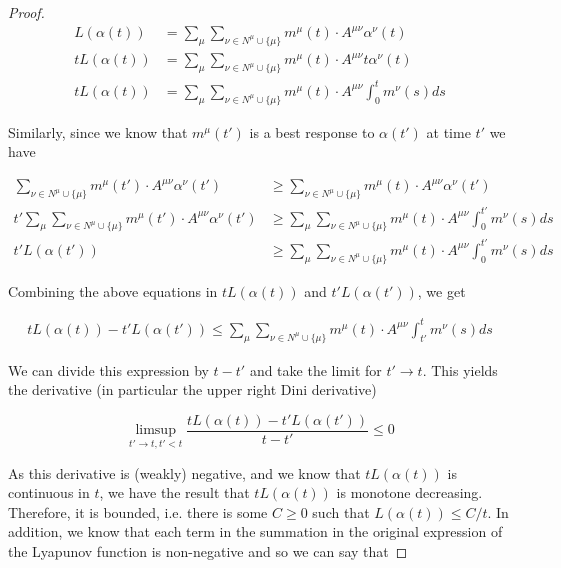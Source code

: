 \documentclass{article}
\theoremstyle{definition}
\begin{document}
\begin{proof}
		\begin{align}
			L(\alpha(t)) & = \sum_\mu \sum_{\nu \in N^\mu \cup \{\mu\}} m^\mu(t) \cdot A^{\mu \nu} \alpha^\nu(t) \\
			t L(\alpha(t)) & = \sum_\mu \sum_{\nu \in N^\mu \cup \{\mu\}} m^\mu(t) \cdot A^{\mu \nu} t \alpha^\nu(t) \\
			t L(\alpha(t)) & = \sum_\mu \sum_{\nu \in N^\mu \cup \{\mu\}} m^\mu(t) \cdot A^{\mu \nu} \int_0^t m^\nu(s) ds
		\end{align}

		Similarly, since we know that $m^\mu(t')$ is a best response to $\alpha(t')$ at time $t'$ we have

		\begin{align}
			\sum_{\nu \in N^\mu \cup \{\mu\}} m^\mu(t') \cdot A^{\mu \nu} \alpha^\nu(t') & \geq \sum_{\nu \in N^\mu \cup \{\mu\}} m^\mu(t) \cdot A^{\mu \nu} \alpha^\nu(t') \\
			t' \sum_\mu \sum_{\nu \in N^\mu \cup \{\mu\}} m^\mu(t') \cdot A^{\mu \nu} \alpha^\nu(t') & \geq \sum_\mu \sum_{\nu \in N^\mu \cup \{\mu\}} m^\mu(t) \cdot A^{\mu \nu} \int_0^{t'} m^\nu(s) ds \\
			t' L(\alpha(t')) & \geq \sum_\mu \sum_{\nu \in N^\mu \cup \{\mu\}} m^\mu(t) \cdot A^{\mu \nu} \int_0^{t'} m^\nu(s) ds 
		\end{align}

		Combining the above equations in $t L(\alpha(t))$ and $t' L(\alpha(t'))$, we get

		\begin{align}
			t L(\alpha(t)) - t' L(\alpha(t')) \leq \sum_\mu \sum_{\nu \in N^\mu \cup \{\mu\}} m^\mu(t) \cdot A^{\mu \nu} \int_{t'}^{t} m^\nu(s) ds 
		\end{align}

		We can divide this expression by $t - t'$ and take the limit for $t' \rightarrow t$. This yields the derivative (in particular the upper right Dini derivative)

		\begin{equation}
			\limsup_{t' \rightarrow t, t' < t}\frac{t L(\alpha(t)) - t' L(\alpha(t'))}{t - t'} \leq 0
		\end{equation}

		As this derivative is (weakly) negative, and we know that $tL(\alpha(t))$ is continuous in $t$, we have the result that $t L(\alpha(t))$ is monotone decreasing. Therefore, it is bounded, i.e. there is some $C \geq 0$ such that $L(\alpha(t)) \leq C/t$. In addition, we know that each term in the summation in the original expression of the Lyapunov function is non-negative and so we can say that


\end{proof}
\end{document}
